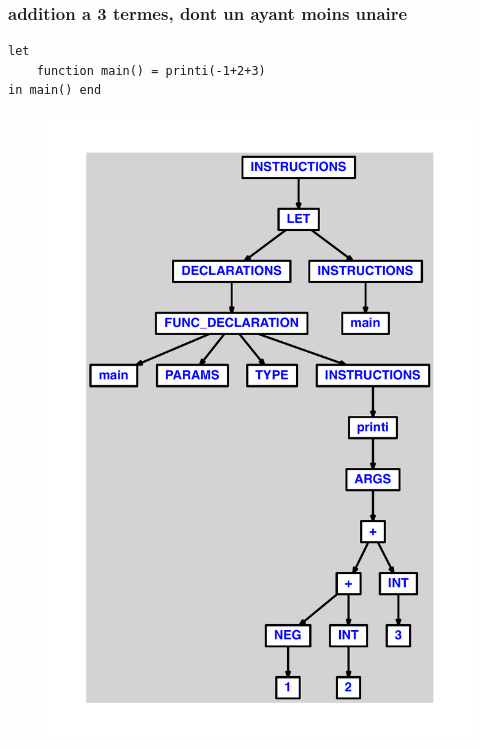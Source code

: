 \documentclass{article}
\begin{document}
\subsubsection{addition a 3 termes, dont un ayant moins unaire}
\begin{lstlisting}
let
	function main() = printi(-1+2+3)
in main() end
\end{lstlisting}
\newpage
\begin{figure}[H]
\centering
\includegraphics[max width=\textwidth]{ast/ast_67.pdf}
\end{figure}
\newpage
\end{document}
